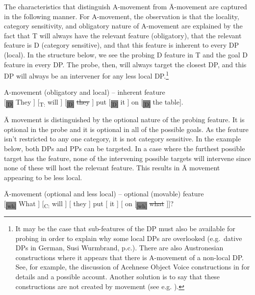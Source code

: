 \documentclass[output=paper,colorlinks,citecolor=brown,
]{langscibook}
\begin{document}
The characteristics that distinguish  A-movement from \=A-movement are captured in the following manner.  For A-movement, the observation is that the locality, category sensitivity, and obligatory nature of A-movement are explained by the fact that T will always have the relevant feature (obligatory), that the relevant feature is D (category sensitive), and that this feature is inherent to every DP (local).  In the structure below, we see the probing D feature in T and the goal D feature in every DP.  The probe, then, will always target the closest DP, and this DP will always be an intervener for any less local DP.\footnote{It may be the case that sub-features of the DP must also be available for probing in order to explain why some local DPs are overlooked (e.g.\ dative DPs in German, Susi Wurmbrand, p.c.).  There are also  Austronesian constructions where it appears that there is A-movement of a non-local DP.  See, for example, the discussion of Acehnese Object Voice constructions in \citet[Chapter 3]{Legate:2014} for details and a possible account.  Another solution is to say that these constructions are not created by movement (see e.g. \citealt{Travis:2006a}).}

\ea A-movement (obligatory and local) -- inherent feature\\ 
{[}\textsubscript{\colorbox{Gray}{[D]}} They ]  [\textsubscript{T:} will ] [\textsubscript{\colorbox{Gray}{[D]}} \sout{they} ] put [\textsubscript{\colorbox{Gray}{[D]}} it ] on [\textsubscript{\colorbox{Gray}{[D]}} the table].
\z

\hspace{\parindent} \=A movement is distinguished by the optional nature of the probing feature.  It is optional in the probe and it is optional in all of the possible goals.  As the feature isn't restricted to any one category, it is not category sensitive.  In the example below, both DPs and PPs can be targeted.  In a case where the furthest possible target has the feature, none of the intervening possible targets will intervene since none of these will host the relevant feature.  This results in \=A movement appearing to be less local.  

\ea \=A-movement (optional and less local) -- optional (movable) feature\\
\vspace{.2cm}
[\textsubscript{\colorbox{Gray}{[wh]}} What ] [\textsubscript{C:} will ] {[} they  ] put [ it ] [ on [\textsubscript{\colorbox{Gray}{[wh]}} \sout{what} ]]? \label{ex:wh5}
\z
\end{document}
